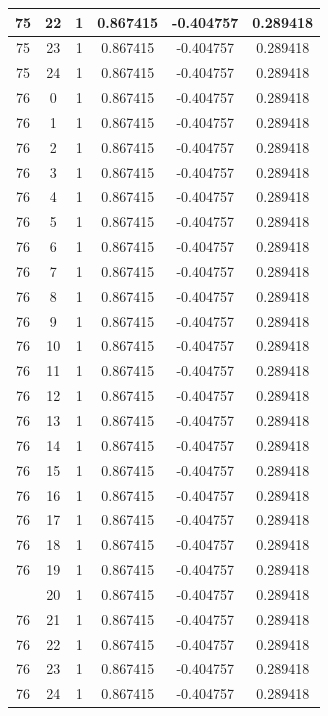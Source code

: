 \documentclass[12pt,a4paper]{article}
\numberwithin{equation}{section}
\numberwithin{figure}{section}
\numberwithin{table}{section}
\begin{document}
\begin{longtable}{|c|c|c|c|c|c|}
75 & 22 & 1 & 0.867415 & -0.404757 & 0.289418 \\ \hline
75 & 23 & 1 & 0.867415 & -0.404757 & 0.289418 \\ \hline
75 & 24 & 1 & 0.867415 & -0.404757 & 0.289418 \\ \hline
76 & 0 & 1 & 0.867415 & -0.404757 & 0.289418 \\ \hline
76 & 1 & 1 & 0.867415 & -0.404757 & 0.289418 \\ \hline
76 & 2 & 1 & 0.867415 & -0.404757 & 0.289418 \\ \hline
76 & 3 & 1 & 0.867415 & -0.404757 & 0.289418 \\ \hline
76 & 4 & 1 & 0.867415 & -0.404757 & 0.289418 \\ \hline
76 & 5 & 1 & 0.867415 & -0.404757 & 0.289418 \\ \hline
76 & 6 & 1 & 0.867415 & -0.404757 & 0.289418 \\ \hline
76 & 7 & 1 & 0.867415 & -0.404757 & 0.289418 \\ \hline
76 & 8 & 1 & 0.867415 & -0.404757 & 0.289418 \\ \hline
76 & 9 & 1 & 0.867415 & -0.404757 & 0.289418 \\ \hline
76 & 10 & 1 & 0.867415 & -0.404757 & 0.289418 \\ \hline
76 & 11 & 1 & 0.867415 & -0.404757 & 0.289418 \\ \hline
76 & 12 & 1 & 0.867415 & -0.404757 & 0.289418 \\ \hline
76 & 13 & 1 & 0.867415 & -0.404757 & 0.289418 \\ \hline
76 & 14 & 1 & 0.867415 & -0.404757 & 0.289418 \\ \hline
76 & 15 & 1 & 0.867415 & -0.404757 & 0.289418 \\ \hline
76 & 16 & 1 & 0.867415 & -0.404757 & 0.289418 \\ \hline
76 & 17 & 1 & 0.867415 & -0.404757 & 0.289418 \\ \hline
76 & 18 & 1 & 0.867415 & -0.404757 & 0.289418 \\ \hline
76 & 19 & 1 & 0.867415 & -0.404757 & 0.289418 \\ \hline
\pagebreak
76 & 20 & 1 & 0.867415 & -0.404757 & 0.289418 \\ \hline
76 & 21 & 1 & 0.867415 & -0.404757 & 0.289418 \\ \hline
76 & 22 & 1 & 0.867415 & -0.404757 & 0.289418 \\ \hline
76 & 23 & 1 & 0.867415 & -0.404757 & 0.289418 \\ \hline
76 & 24 & 1 & 0.867415 & -0.404757 & 0.289418 \\ \hline

\end{longtable}
\end{document}
